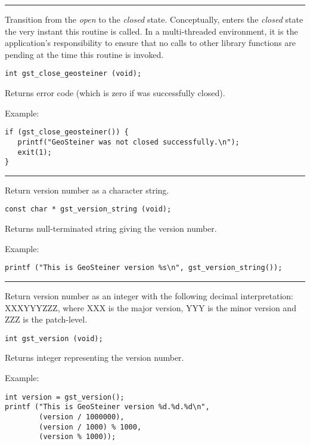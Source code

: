 \hrule
\vskip 0.25in
Transition \geosteiner{} from the {\em open} to the {\em closed} state.
Conceptually, \geosteiner{} enters the {\em closed} state the
very instant this routine is called. 
In a multi-threaded environment, it is the application's
responsibility to ensure that no calls to other \geosteiner{} library
functions are pending at the time this routine is invoked. 

\begin{verbatim}
int gst_close_geosteiner (void);

\end{verbatim}
Returns error code (which is zero if \geosteiner{} was successfully closed).

\bigskip{}Example:
{\footnotesize
\begin{verbatim}
if (gst_close_geosteiner()) {
   printf("GeoSteiner was not closed successfully.\n");
   exit(1);
}
\end{verbatim}
}
\clearpage{}
\label{gst_version_string}

\hrule
\vskip 0.25in
Return \geosteiner{} version number as a character string.

\begin{verbatim}
const char * gst_version_string (void);

\end{verbatim}
Returns null-terminated string giving the \geosteiner{} version number.

\bigskip{}Example:
{\footnotesize
\begin{verbatim}
printf ("This is GeoSteiner version %s\n", gst_version_string());
\end{verbatim}
}
\clearpage{}
\label{gst_version}

\hrule
\vskip 0.25in
Return \geosteiner{} version number as an integer with the following
decimal interpretation: XXXYYYZZZ, where XXX is the major version, YYY
is the minor version and ZZZ is the patch-level.

\begin{verbatim}
int gst_version (void);

\end{verbatim}
Returns integer representing the version number.

\bigskip{}Example:
{\footnotesize
\begin{verbatim}
int version = gst_version();
printf ("This is GeoSteiner version %d.%d.%d\n", 
        (version / 1000000),
        (version / 1000) % 1000,
        (version % 1000));
\end{verbatim}
}
\clearpage{}
\label{gst_open_lpsolver}

